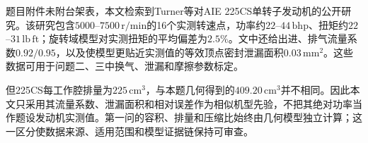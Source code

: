 题目附件未附台架表，本文检索到Turner等对AIE 225CS单转子发动机的公开研究\cite{turner2018wankel}。该研究包含$5000$--$7500\,\mathrm{r/min}$的16个实测转速点，功率约$22$--$44\,\mathrm{bhp}$、扭矩约$22$--$31\,\mathrm{lb\,ft}$；旋转域模型对实测扭矩的平均偏差为$2.5\%$。文中还给出进、排气流量系数$0.92/0.95$，以及使模型更贴近实测值的等效顶点密封泄漏面积$0.03\,\mathrm{mm^2}$。这些数据可用于问题二、三中换气、泄漏和摩擦参数标定。

但225CS每工作腔排量为$225\,\mathrm{cm^3}$，与本题几何得到的$409.20\,\mathrm{cm^3}$并不相同。因此本文只采用其流量系数、泄漏面积和相对误差作为相似机型先验，不把其绝对功率当作题设发动机实测值。第一问的容积、排量和压缩比始终由几何模型独立计算；这一区分使数据来源、适用范围和模型证据链保持可审查。
